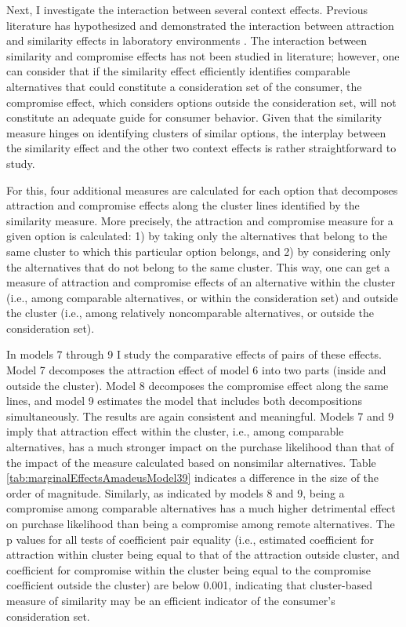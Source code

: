 \documentclass[a4paper,12pt]{article}
\begin{document}
Next, I investigate the interaction between several context effects. Previous literature has hypothesized and demonstrated the interaction between attraction and similarity effects in laboratory environments \citep{huberEtAl82, huberPuto83, roodrkerkEtAl11}. The interaction between similarity and compromise effects has not been studied in literature; however, one can consider that if the similarity effect efficiently identifies comparable alternatives that could constitute a consideration set of the consumer, the compromise effect, which considers options outside the consideration set, will not constitute an adequate guide for consumer behavior.  Given that the similarity measure hinges on identifying clusters of similar options, the interplay between the similarity effect and the other two context effects is rather straightforward to study. 

For this, four additional measures are calculated for each option that decomposes attraction and compromise effects along the cluster lines identified by the similarity measure. More precisely, the attraction and compromise measure for a given option is calculated: 1) by taking only the alternatives that belong to the same cluster to which this particular option belongs, and 2) by considering only the alternatives that do not belong to the same cluster. This way, one can get a measure of attraction and compromise effects of an alternative within the cluster (i.e., among comparable alternatives, or within the consideration set) and outside the cluster (i.e., among relatively noncomparable alternatives, or outside the consideration set).

In models 7 through 9 I study the comparative effects of pairs of these effects. Model 7 decomposes the attraction effect of model 6 into two parts (inside and outside the cluster).  Model 8 decomposes the compromise effect along the same lines, and model 9 estimates the model that includes both decompositions simultaneously. The results are again consistent and meaningful. Models 7 and 9 imply that attraction effect within the cluster, i.e., among comparable alternatives, has a much stronger impact on the purchase likelihood than that of the impact of the measure calculated based on nonsimilar alternatives. Table \ref{tab:marginalEffectsAmadeusModel39} indicates a difference in the size of the order of magnitude. Similarly, as indicated by models 8 and 9, being a compromise among comparable alternatives has a much higher detrimental effect on purchase likelihood than being a compromise among remote alternatives. The p values for all tests of coefficient pair equality (i.e., estimated coefficient for attraction within cluster being equal to that of the attraction outside cluster, and coefficient for compromise within the cluster being equal to the compromise coefficient outside the cluster) are below 0.001, indicating that cluster-based measure of similarity may be an efficient indicator of the consumer's consideration set.
\end{document}
